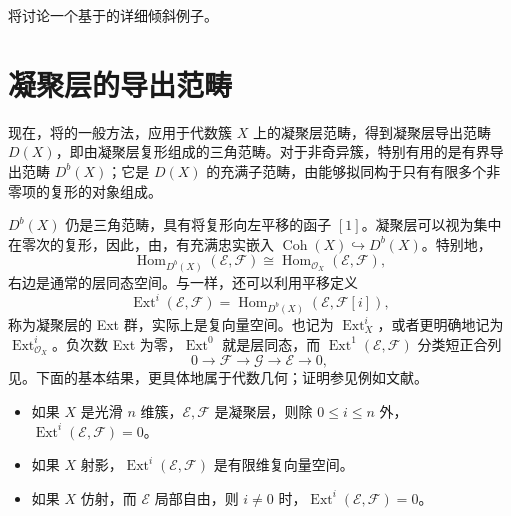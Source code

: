 将讨论一个基于的详细倾斜例子。

\section{凝聚层的导出范畴}\label{sec:4.5}

现在，将的一般方法，应用于代数簇 $X$ 上的凝聚层范畴，得到凝聚层导出范畴 $D(X)$，即由凝聚层复形组成的三角范畴。对于非奇异簇，特别有用的是有界导出范畴 $D^b(X)$；它是 $D(X)$ 的充满子范畴，由能够拟同构于只有有限多个非零项的复形的对象组成。

$D^b(X)$ 仍是三角范畴，具有将复形向左平移的函子 $[1]$。凝聚层可以视为集中在零次的复形，因此，由，有充满忠实嵌入 $\operatorname{Coh}(X)\hookrightarrow D^b(X)$。特别地，
\[
\operatorname{Hom}_{D^b(X)}(\mathcal{E},\mathcal{F})
\cong\operatorname{Hom}_{\mathcal{O}_X}(\mathcal{E},\mathcal{F}),
\]
右边是通常的层同态空间。与一样，还可以利用平移定义
\[
\operatorname{Ext}^i(\mathcal{E},\mathcal{F})
=\operatorname{Hom}_{D^b(X)}(\mathcal{E},\mathcal{F}[i]),
\]
称为凝聚层的 Ext 群，实际上是复向量空间。也记为 $\operatorname{Ext}^i_X$，或者更明确地记为 $\operatorname{Ext}^i_{\mathcal{O}_X}$。负次数 Ext 为零，$\operatorname{Ext}^0$ 就是层同态，而 $\operatorname{Ext}^1(\mathcal{E},\mathcal{F})$ 分类短正合列
\[
0\longrightarrow\mathcal{F}\longrightarrow\mathcal{G}
\longrightarrow\mathcal{E}\longrightarrow0,
\]
见。下面的基本结果，更具体地属于代数几何；证明参见例如文献。

\begin{proposition}\label{prop:4.59}
\begin{itemize}
\item 如果 $X$ 是光滑 $n$ 维簇，$\mathcal{E},\mathcal{F}$ 是凝聚层，则除 $0\le i\le n$ 外，$\operatorname{Ext}^i(\mathcal{E},\mathcal{F})=0$。
\item 如果 $X$ 射影，$\operatorname{Ext}^i(\mathcal{E},\mathcal{F})$ 是有限维复向量空间。
\item 如果 $X$ 仿射，而 $\mathcal{E}$ 局部自由，则 $i\ne0$ 时，$\operatorname{Ext}^i(\mathcal{E},\mathcal{F})=0$。
\end{itemize}
\end{proposition}

